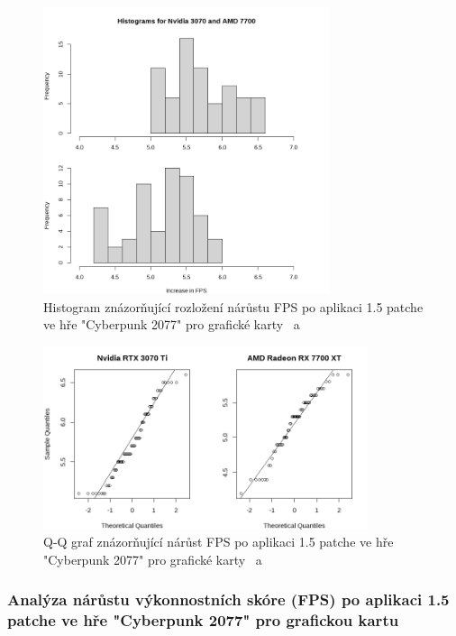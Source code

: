 \begin{figure}[h!]
    \centering
    \includegraphics[width=0.75\textwidth]{assets/histogram}
    \caption{Histogram znázorňující rozložení nárůstu FPS po aplikaci 1.5 patche ve hře "Cyberpunk 2077" pro grafické karty \nvidiaCardTri\ a \amdCardSedm}
    \label{fig:histogram}
\end{figure}

\begin{figure}[h!]
    \centering
    \includegraphics[width=0.85\textwidth]{assets/qq}
    \caption{Q-Q graf znázorňující nárůst FPS po aplikaci 1.5 patche ve hře "Cyberpunk 2077" pro grafické karty \nvidiaCardTri\ a \amdCardSedm}
    \label{fig:qq}
\end{figure}

\newpage
\subsubsection*{Analýza nárůstu výkonnostních skóre (FPS) po aplikaci 1.5 patche ve hře "Cyberpunk 2077" pro grafickou kartu \nvidiaCardTri}

